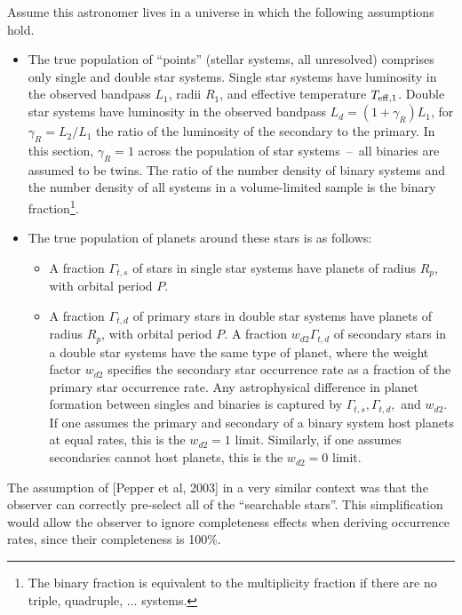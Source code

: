 \documentclass{emulateapj}
\begin{document}
Assume this astronomer lives in a universe in which the following assumptions 
hold.
\begin{itemize}
	\item The true population of ``points'' (stellar systems, all unresolved) 
	comprises only single and double star systems. Single star systems have 
	luminosity in the observed bandpass $L_1$, radii $R_1$, and effective 
	temperature $T_{\rm eff,1}$.
	Double star systems have luminosity in the observed bandpass $L_d = 
	(1+\gamma_R)L_1$, for $\gamma_R = L_2/L_1$ the ratio of the luminosity of 
	the secondary to the primary. 
	In this section, $\gamma_R=1$ across the population 
	of star systems~--~all binaries are assumed to be twins.
	The ratio of the number density of binary systems and the number density of 
	all systems in a volume-limited sample is the binary fraction\footnote{The 
	binary fraction is equivalent to the multiplicity fraction if there are 
	no triple, quadruple, $\ldots$ systems.}.
	\item The true population of planets around these stars is as follows:
	\begin{itemize}
	\item A fraction $\Gamma_{t,s}$ of stars in single star systems 
	have planets of radius $R_p$, with orbital period $P$.
	\item A fraction $\Gamma_{t,d}$ of primary stars in double star 
	systems have planets of radius $R_p$, with orbital period $P$. 
	A fraction $w_{d2}\Gamma_{t,d}$ of secondary stars in a double star 
	systems have the same type of 
	planet, where the weight factor $w_{d2}$ specifies the secondary star 
	occurrence rate as a fraction	of the primary star occurrence rate.
	Any astrophysical difference in planet formation between singles and 
	binaries is captured by $\Gamma_{t,s}, \Gamma_{t,d},$ and $w_{d2}$.
	If one assumes the primary and secondary of a binary system host planets at 
	equal rates, this is the $w_{d2}=1$ limit.
	Similarly, if one assumes  secondaries 
	cannot host planets, this is the $w_{d2}=0$ limit.
	\end{itemize}
\end{itemize}

The assumption of [Pepper et al, 2003] in a very similar context was that the 
observer can correctly pre-select all of the ``searchable stars''.
This simplification would allow the observer to ignore 
completeness effects when deriving occurrence rates, since their completeness 
is 100\%.
\end{document}
